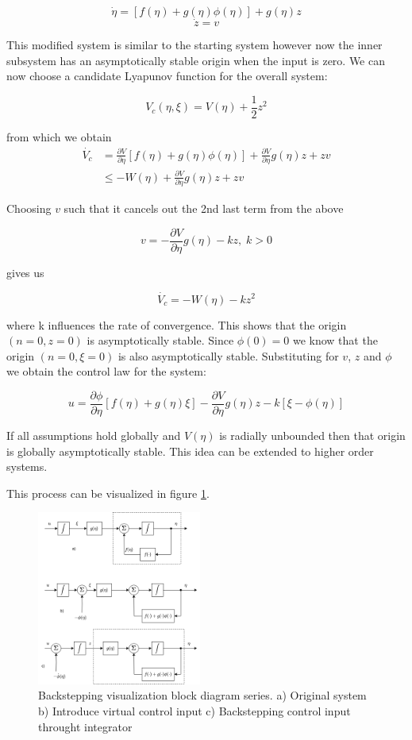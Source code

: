 $$ \dot{\eta} = [f(\eta) + g(\eta)\phi(\eta)] + g(\eta)z  $$
$$ \dot{z} = v $$

This modified system is similar to the starting system however now the inner subsystem has an asymptotically stable origin when the input is zero. We can now choose a candidate Lyapunov function for the overall system:

$$ V_c (\eta,\xi) = V(\eta) + \frac{1}{2}z^2 $$

from which we obtain
\begin{align}
    \dot{V_c} &= \frac{\partial V}{\partial \eta}[f(\eta) + g(\eta)\phi(\eta)] + \frac{\partial V}{\partial \eta}g(\eta)z + zv \\
    &\leq -W(\eta) + \frac{\partial V}{\partial \eta}g(\eta)z + zv
\end{align}

Choosing $v$ such that it cancels out the 2nd last term from the above

$$ v = -\frac{\partial V}{\partial \eta}g(\eta) - kz, \; k > 0 $$

gives us

$$ \dot{V_c} = -W(\eta) - kz^2 $$

where k influences the rate of convergence.
This shows that the origin $(n=0, z=0)$ is asymptotically stable. Since $\phi(0) = 0$ we know that the origin $(n=0, \xi=0)$ is also asymptotically stable. Substituting for $v$, $z$ and $\phi$ we obtain the control law for the system:

\begin{equation}
    u =  \frac{\partial \phi}{\partial \eta} [f(\eta) + g(\eta)\xi] - \frac{\partial V}{\partial \eta}g(\eta)z - k[\xi - \phi(\eta)]
\end{equation}

If all assumptions hold globally and $V(\eta)$ is radially unbounded then that origin is globally asymptotically stable.
This idea can be extended to higher order systems.

\par
This process can be visualized in figure \ref{fig:backstepping}.

\begin{figure}
    \centering
    \includegraphics[width=0.48\textwidth]{Y1-report/Backstepping_diagram.drawio.png}
    \caption{Backstepping visualization block diagram series. a) Original system b) Introduce virtual control input c) Backstepping control input throught integrator}
    \label{fig:backstepping}
\end{figure}

